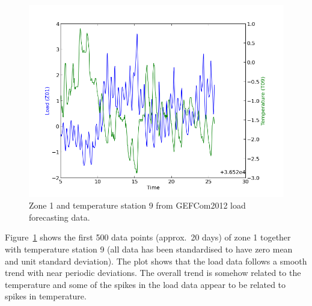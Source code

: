\documentclass[twoside]{article}
\theoremstyle{definition}
\theoremstyle{remark}
\numberwithin{equation}{section}
\numberwithin{thm}{section}
\begin{document}
\begin{figure}
\includegraphics[width=\columnwidth]{../figures/gef_load_z01_t09_500}
\caption{Zone 1 and temperature station 9 from GEFCom2012 load forecasting data.}
\label{fig:gef_z01_t09}
\end{figure}

Figure~\ref{fig:gef_z01_t09} shows the first 500 data points (approx.~20 days) of zone 1 together with temperature station 9 (all data has been standardised to have zero mean and unit standard deviation).
The plot shows that the load data follows a smooth trend with near periodic deviations.
The overall trend is somehow related to the temperature and some of the spikes in the load data appear to be related to spikes in temperature.
\end{document}
